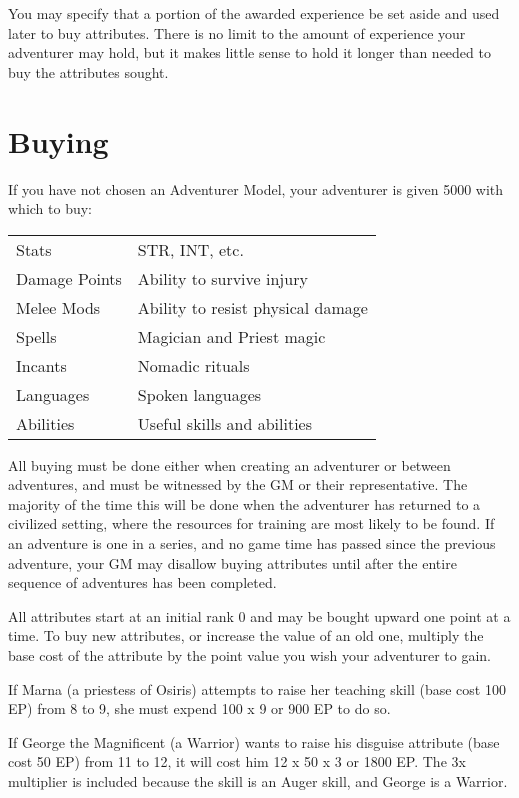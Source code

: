 You may specify that a portion of the awarded experience be set aside and used later to buy attributes. There is no limit to the amount of experience your adventurer may hold, but it makes little sense to hold it longer than needed to buy the attributes sought.
\section{Buying}
\label{create-buying}
If you have not chosen an Adventurer Model, your adventurer is given 5000 \EP with which to buy:

\begin{normbox}
\small
\begin{tabular}{@{}l l}
Stats & STR, INT, etc.\\
Damage Points  & Ability to survive injury\\
Melee Mods & Ability to resist physical damage\\
Spells & Magician and Priest magic\\
Incants & Nomadic rituals\\
Languages & Spoken languages\\
Abilities & Useful skills and abilities\\
\end{tabular}
\end{normbox}

All buying must be done either when creating an adventurer or between adventures, and must be witnessed by the GM or their representative. The majority of the time this will be done when the adventurer has returned to a civilized setting, where the resources for training are most likely to be found. If an adventure is one in a series, and no game time has passed since the previous adventure, your GM may disallow buying attributes until after the entire sequence of adventures has been completed.

All attributes start at an initial rank 0 and may be bought upward one point at a time. To buy new attributes, or increase the value of an old one, multiply the base cost of the attribute by the point value you wish your adventurer to gain.

If Marna (a priestess of Osiris) attempts to raise her teaching skill (base cost 100 EP) from 8 to 9, she must expend 100 x 9 or 900 EP to do so.

If George the Magnificent (a Warrior) wants to raise his disguise attribute (base cost 50 EP) from 11 to 12, it will cost him 12 x 50 x 3 or 1800 EP. The 3x multiplier is included because the skill is an Auger skill, and George is a Warrior. 

